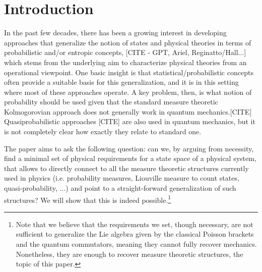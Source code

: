 \documentclass[10pt,twocolumn, nofootinbib]{revtex4-2}
\begin{document}
\section{Introduction}

In the past few decades, there has been a growing interest in developing approaches that generalize the notion of states and physical theories in terms of probabilistic and/or entropic concepts, [CITE - GPT, Ariel, Reginatto/Hall...] which stems from the underlying aim to characterize physical theories from an operational viewpoint. One basic insight is that statistical/probabilistic concepts often provide a suitable basis for this generalization, and it is in this setting where most of these approaches operate. A key problem, then, is what notion of probability should be used given that the standard measure theoretic Kolmogorovian approach does not generally work in quantum mechanics.[CITE] Quasiprobabilistic approaches [CITE] are also used in quantum mechanics, but it is not completely clear how exactly they relate to standard one.

The paper aims to ask the following question: can we, by arguing from necessity, find a minimal set of physical requirements for a state space of a physical system, that allows to directly connect to all the measure theoretic structures currently used in physics (i.e. probability measures, Liouville measure to count states, quasi-probability, ...) and point to a straight-forward generalization of such structures? We will show that this is indeed possible.\footnote{Note that we believe that the requirements we set, though necessary, are not sufficient to generalize the Lie algebra given by the classical Poisson brackets and the quantum commutators, meaning they cannot fully recover mechanics. Nonetheless, they are enough to recover measure theoretic structures, the topic of this paper.}
\end{document}
